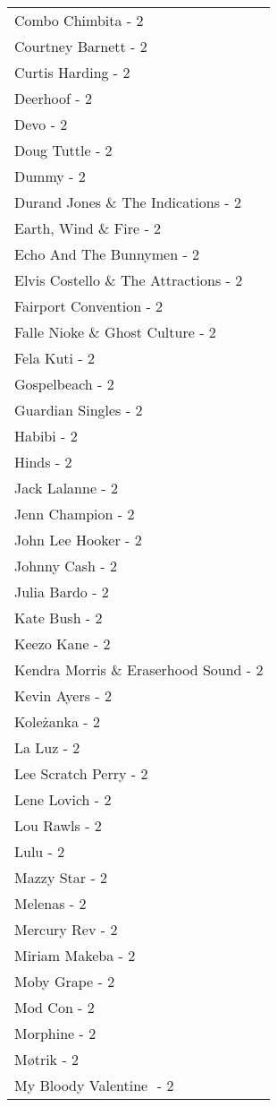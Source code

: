 \documentclass[
]{article}
\begin{document}
\begin{longtable}{l}
Combo Chimbita - 2 \\ 
Courtney Barnett - 2 \\ 
Curtis Harding - 2 \\ 
Deerhoof - 2 \\ 
Devo - 2 \\ 
Doug Tuttle - 2 \\ 
Dummy - 2 \\ 
Durand Jones \& The Indications - 2 \\ 
Earth, Wind \& Fire - 2 \\ 
Echo And The Bunnymen - 2 \\ 
Elvis Costello \& The Attractions - 2 \\ 
Fairport Convention - 2 \\ 
Falle Nioke \& Ghost Culture - 2 \\ 
Fela Kuti - 2 \\ 
Gospelbeach - 2 \\ 
Guardian Singles - 2 \\ 
Habibi - 2 \\ 
Hinds - 2 \\ 
Jack Lalanne - 2 \\ 
Jenn Champion - 2 \\ 
John Lee Hooker - 2 \\ 
Johnny Cash - 2 \\ 
Julia Bardo - 2 \\ 
Kate Bush - 2 \\ 
Keezo Kane - 2 \\ 
Kendra Morris \& Eraserhood Sound - 2 \\ 
Kevin Ayers - 2 \\ 
Koleżanka - 2 \\ 
La Luz - 2 \\ 
Lee Scratch Perry - 2 \\ 
Lene Lovich - 2 \\ 
Lou Rawls - 2 \\ 
Lulu - 2 \\ 
Mazzy Star - 2 \\ 
Melenas - 2 \\ 
Mercury Rev - 2 \\ 
Miriam Makeba - 2 \\ 
Moby Grape - 2 \\ 
Mod Con - 2 \\ 
Morphine - 2 \\ 
Møtrik - 2 \\ 
My Bloody Valentine ‎ - 2 \\ 

\end{longtable}
\end{document}
